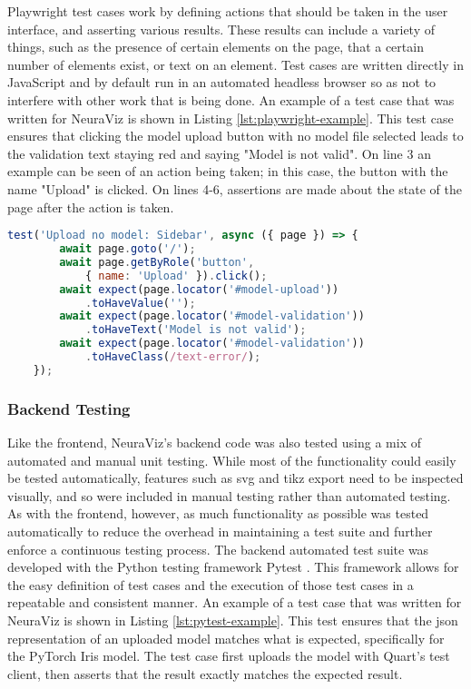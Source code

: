 Playwright test cases work by defining actions that should be taken in the user interface, and asserting various results. These results can include a variety of things, such as the presence of certain elements on the page, that a certain number of elements exist, or text on an element. Test cases are written directly in JavaScript and by default run in an automated headless browser so as not to interfere with other work that is being done. An example of a test case that was written for NeuraViz is shown in Listing \ref{lst:playwright-example}. This test case ensures that clicking the model upload button with no model file selected leads to the validation text staying red and saying "Model is not valid". On line 3 an example can be seen of an action being taken; in this case, the button with the name "Upload" is clicked. On lines 4-6, assertions are made about the state of the page after the action is taken.

\begin{center}
    \begin{lstlisting}[language=JavaScript, float=*htb, caption={Playwright Test Case Example}, label={lst:playwright-example}]
    test('Upload no model: Sidebar', async ({ page }) => {
        await page.goto('/');
        await page.getByRole('button', 
            { name: 'Upload' }).click();
        await expect(page.locator('#model-upload'))
            .toHaveValue('');
        await expect(page.locator('#model-validation'))
            .toHaveText('Model is not valid');
        await expect(page.locator('#model-validation'))
            .toHaveClass(/text-error/);
    });
    \end{lstlisting}
\end{center}

\subsubsection{Backend Testing}
Like the frontend, NeuraViz's backend code was also tested using a mix of automated and manual unit testing. While most of the functionality could easily be tested automatically, features such as svg and tikz export need to be inspected visually, and so were included in manual testing rather than automated testing. As with the frontend, however, as much functionality as possible was tested automatically to reduce the overhead in maintaining a test suite and further enforce a continuous testing process. The backend automated test suite was developed with the Python testing framework Pytest \cite{pytest}. This framework allows for the easy definition of test cases and the execution of those test cases in a repeatable and consistent manner. An example of a test case that was written for NeuraViz is shown in Listing \ref{lst:pytest-example}. This test ensures that the json representation of an uploaded model matches what is expected, specifically for the PyTorch Iris model. The test case first uploads the model with Quart's test client, then asserts that the result exactly matches the expected result.


